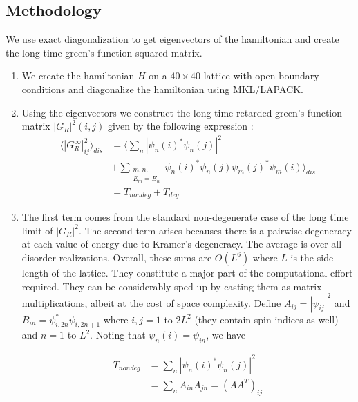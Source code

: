 \documentclass[twocolumn]{article}
\begin{document}
\subsection{Methodology}
We use exact diagonalization to get eigenvectors of the hamiltonian
and create the long time green's function squared matrix.
\begin{enumerate}
    \item We create the hamiltonian $H$ on a $40\times40$
        lattice with open boundary conditions and diagonalize
        the hamiltonian using MKL/LAPACK.

    \item Using the eigenvectors we construct the long time
        retarded green's function matrix $|G_R|^2(i,j)$ given by
        the following expression \cite{chakrabortyMemoriesInitialStates2020}:
        \begin{align*}
        \langle|G_R^\infty|^2_{ij}\rangle_{dis} &=
            \langle\sum_{n}|\psi_n(i)^*\psi_n(j)|^2 \\
            &+ \sum_{\substack{m,n,\\E_m = E_n}}\psi_n(i)^* \psi_n(j) 
            \psi_m(j)^* \psi_m(i)\rangle_{dis} \\
            &= T_{nondeg} + T_{deg}
        \end{align*}

    \item The first term comes from the standard
        non-degenerate case of the long time limit of $|G_R|^2$.
        The second term arises becauses there is a pairwise
        degeneracy at each value of energy due to Kramer's
        degeneracy. The average is over all disorder
        realizations. Overall, these sums are $O(L^6)$ where $L$
        is the side length of the lattice. They constitute a
        major part of the computational effort required. They
        can be considerably sped up by casting them as matrix
        multiplications, albeit at the cost of space complexity.
        Define $A_{ij} = |\psi_{ij}|^2$ and $B_{in} =
        \psi_{i,2n}^* \psi_{i,2n+1}$ where $i,j = 1$ to $2L^2$
        (they contain spin indices as well) and $n = 1$ to
        $L^2$. Noting that $\psi_n(i) = \psi_{in}$, we have

        \begin{align*}
            T_{nondeg} &= \sum_{n}|\psi_n(i)^*\psi_n(j)|^2 \\
            &= \sum_n A_{in}A_{jn} = (AA^T)_{ij}
        \end{align*}
    

\end{enumerate}
\end{document}
